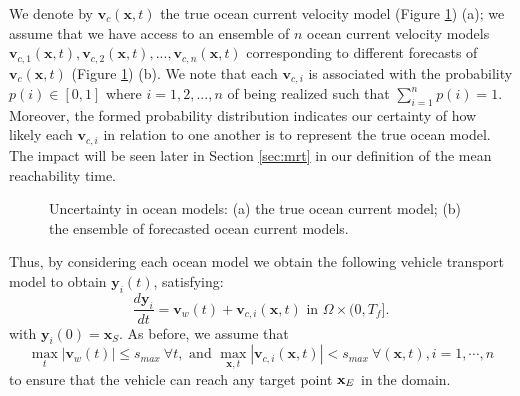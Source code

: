 \documentclass[pdflatex,sn-mathphys-num]{sn-jnl}%
\def \bx{{\mathbf {x}}}
\def \by{{\mathbf {y}}}
\def \bv{{\mathbf {v}}}
\theoremstyle{thmstyleone}%
\theoremstyle{thmstyletwo}%
\theoremstyle{thmstylethree}%
\begin{document}
We denote by $\bv_c(\bx,t)$ the true ocean current velocity model (Figure \ref{fig:ensemble}) (a); we assume that we have access to an ensemble of $n$ ocean current velocity models $\bv_{c,1}(\bx,t), \bv_{c,2}(\bx,t), ..., \bv_{c,n}(\bx,t)$ corresponding to different forecasts of $\bv_c(\bx,t)$ (Figure \ref{fig:ensemble}) (b).
We note that each $\bv_{c,i}$ is associated with the probability  $p(i) \in [0,1]$ where $i=1,2,...,n$ of being realized such that $\sum_{i=1}^n p(i) = 1$.  Moreover, the formed probability distribution indicates our certainty of how likely each $\bv_{c,i}$ in relation to one another is to represent the true ocean model.  The impact will be seen later in Section \ref{sec:mrt} in our definition of the mean reachability time.

\begin{figure}[!ht]
\centering
{}
\caption{Uncertainty in ocean models: (a) the true ocean current model; (b) the ensemble of forecasted ocean current models.}
\label{fig:ensemble}
\end{figure}



Thus, by considering each ocean model we obtain the following vehicle transport model to obtain $\by_i(t)$, satisfying:
\begin{equation}
   \frac{d\by_i}{dt} = \bv_w(t) + \bv_{c,i}(\bx,t) \text { in } \Omega \times (0,T_f].
\label{eqn:det-ode_i}
\end{equation}
with $\by_i(0) = \bx_S$.
As before, we assume that
\begin{equation}
{ \max\limits_{t}}|\bv_w(t)| { \leq } s_{max}  \ \forall t,  \text{ and } 
{ \max\limits_{\bx,t}}|\bv_{c,i}(\bx,t)| { < } s_{max} \ \forall (\bx,t), 
i=1, \cdots, n
\label{eqn:ode_condition}
\end{equation}
to ensure that the vehicle can reach any target point ${\bf x}_E$ in the domain.
\end{document}
